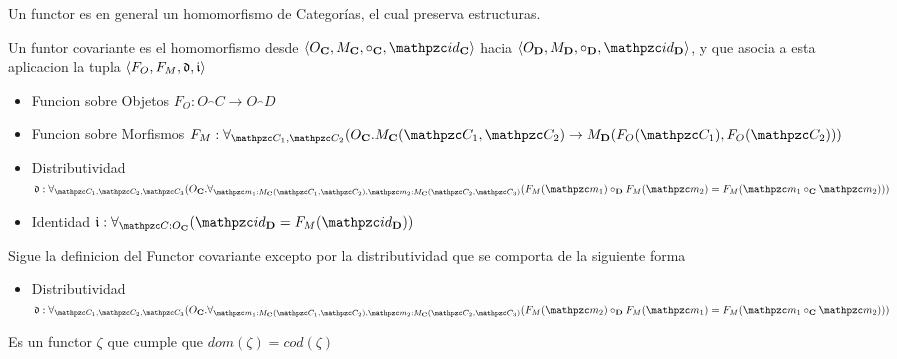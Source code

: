 \begin{defn}[Functor]
Un functor es en general un homomorfismo de Categorías, el cual preserva estructuras.
\end{defn}

\begin{defn}
\end{defn}
Un funtor covariante es el homomorfismo desde $\langle O_\cat{C}, M_\cat{C}, \circ_\cat{C}, \id_\cat{C} \rangle$ hacia $\langle O_\cat{D}, M_\cat{D}, \circ_\cat{D}, \id_\cat{D} \rangle$, y que asocia a esta aplicacion la tupla $\langle F_O, F_M, \mathfrak{d}, \mathfrak{i} \rangle$  
\begin{itemize}
\item Funcion sobre Objetos $F_O : O_\cat{C} \to O_\cat{D}$
\item Funcion sobre Morfismos $F_M : 
\forall_{\ob{C}_1, \ob{C}_2}(O_\cat{C}. M_\cat{C}(\ob{C}_1, \ob{C}_2) \to M_\cat{D}(F_O(\ob{C}_1), F_O(\ob{C}_2)))$
\item Distributividad \\
$\mft{d}: 
\forall_{\ob{C}_1, \ob{C}_2, \ob{C}_3} 
( O_\cat{C} . \forall_{ \mo{m}_1 : M_\cat{C}(\ob{C}_1, \ob{C}_2), \mo{m}_2 : M_\cat{C}(\ob{C}_2, \ob{C}_3)} ( F_M(\mo{m}_1) \circ_\cat{D} F_M(\mo{m}_2) = F_M(\mo{m}_1 \circ_\cat{C} \mo{m}_2)))$
\item Identidad $\mft{i} : \forall_{ \ob{C} : O_\cat{C}}( \id_\cat{D} = F_M(\id_\cat{D}))$
\end{itemize}

\begin{defn}
Sigue la definicion del Functor covariante excepto por la distributividad que se comporta de la siguiente forma
\end{defn}
\begin{itemize}
\item Distributividad \\
$\mft{d}: 
\forall_{\ob{C}_1, \ob{C}_2, \ob{C}_3} 
( O_\cat{C} . \forall_{ \mo{m}_1 : M_\cat{C}(\ob{C}_1, \ob{C}_2), \mo{m}_2 : M_\cat{C}(\ob{C}_2, \ob{C}_3)} ( F_M(\mo{m}_2) \circ_\cat{D} F_M(\mo{m}_1) = F_M(\mo{m}_1 \circ_\cat{C} \mo{m}_2)))$
\end{itemize}

\begin{defn}[Endofunctor]
\end{defn}
Es un functor $\zeta$ que cumple que $dom(\zeta)=cod(\zeta)$

